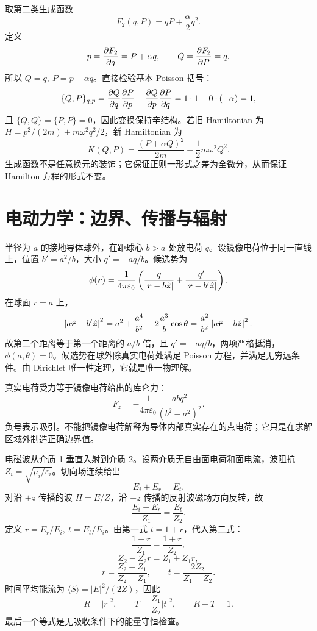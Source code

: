 \begin{examplebox}[title=例 3：由生成函数得到交换坐标和动量的正则变换]
取第二类生成函数
\[
F_2(q,P)=qP+\frac{\alpha}{2}q^2.
\]
定义
\[
p=\frac{\partial F_2}{\partial q}=P+\alpha q,\qquad
Q=\frac{\partial F_2}{\partial P}=q.
\]
所以 $Q=q,\ P=p-\alpha q$。直接检验基本 Poisson 括号：
\[
\{Q,P\}_{q,p}
=\frac{\partial Q}{\partial q}\frac{\partial P}{\partial p}-\frac{\partial Q}{\partial p}\frac{\partial P}{\partial q}
=1\cdot1-0\cdot(-\alpha)=1,
\]
且 $\{Q,Q\}=\{P,P\}=0$，因此变换保持辛结构。若旧 Hamiltonian 为
$H=p^2/(2m)+m\omega^2q^2/2$，新 Hamiltonian 为
\[
K(Q,P)=\frac{(P+\alpha Q)^2}{2m}+\frac12m\omega^2Q^2.
\]
生成函数不是任意换元的装饰；它保证正则一形式之差为全微分，从而保证 Hamilton 方程的形式不变。
\end{examplebox}

\section{电动力学：边界、传播与辐射}

\begin{examplebox}[title=例 4：接地导体球外点电荷的镜像解]
半径为 $a$ 的接地导体球外，在距球心 $b>a$ 处放电荷 $q$。设镜像电荷位于同一直线上，位置 $b'=a^2/b$，大小 $q'=-aq/b$。候选势为
\[
\phi(\bm r)=\frac1{4\pi\varepsilon_0}
\left(\frac q{\left|\bm r-b\hat{\bm z}\right|}
+\frac{q'}{\left|\bm r-b'\hat{\bm z}\right|}\right).
\]
在球面 $r=a$ 上，
\[
\left|a\hat{\bm r}-b'\hat{\bm z}\right|^2
=a^2+\frac{a^4}{b^2}-2\frac{a^3}{b}\cos\theta
=\frac{a^2}{b^2}
\left|a\hat{\bm r}-b\hat{\bm z}\right|^2.
\]
故第二个距离等于第一个距离的 $a/b$ 倍，且 $q'=-aq/b$，两项严格抵消，$\phi(a,\theta)=0$。候选势在球外除真实电荷处满足 Poisson 方程，并满足无穷远条件。由 Dirichlet 唯一性定理，它就是唯一物理解。

真实电荷受力等于镜像电荷给出的库仑力：
\[
F_z=-\frac1{4\pi\varepsilon_0}
\frac{a b q^2}{(b^2-a^2)^2}.
\]
负号表示吸引。不能把镜像电荷解释为导体内部真实存在的点电荷；它只是在求解区域外制造正确边界值。
\end{examplebox}

\begin{examplebox}[title=例 5：垂直入射时由边界条件推出 Fresnel 系数]
电磁波从介质 1 垂直入射到介质 2。设两介质无自由面电荷和面电流，波阻抗
$Z_i=\sqrt{\mu_i/\varepsilon_i}$。切向场连续给出
\[
E_i+E_r=E_t.
\]
对沿 $+z$ 传播的波 $H=E/Z$，沿 $-z$ 传播的反射波磁场方向反转，故
\[
\frac{E_i-E_r}{Z_1}=\frac{E_t}{Z_2}.
\]
定义 $r=E_r/E_i,\ t=E_t/E_i$。由第一式 $t=1+r$，代入第二式：
\[
\frac{1-r}{Z_1}=\frac{1+r}{Z_2},
\]
\[
Z_2-Z_2r=Z_1+Z_1r,
\]
\[
r=\frac{Z_2-Z_1}{Z_2+Z_1},\qquad
t=\frac{2Z_2}{Z_1+Z_2}.
\]
时间平均能流为 $\langle S\rangle=|E|^2/(2Z)$，因此
\[
R=|r|^2,\qquad
T=\frac{Z_1}{Z_2}|t|^2,\qquad R+T=1.
\]
最后一个等式是无吸收条件下的能量守恒检查。
\end{examplebox}

